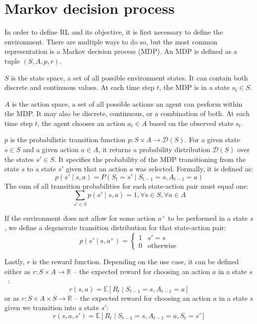 \documentclass[
  digital,     %
  oneside,     %
  nosansbold,  %
  nocolorbold, %
  lof,         %
  lot,         %
]{fithesis4}
\begin{document}
\section{Markov decision process}
In order to define RL and its objective, it is first necessary to define the environment. There are multiple ways to do so, but the most common representation is a Markov decision process (MDP). An MDP is defined as a tuple $(S, A, p, r)$.

$S$ is the state space, a set of all possible environment states. It can contain both discrete and continuous values. At each time step $t$, the MDP is in a state $s_t\in S$.

$A$ is the action space, a set of all possible actions an agent can perform within the MDP. It may also be discrete, continuous, or a combination of both. At each time step $t$, the agent chooses an action $a_t\in A$ based on the observed state $s_t$.

$p$ is the probabilistic transition function $p\colon S \times A \to \mathcal{D}(S)$. For a given state $s\in S$ and a given action $a\in A$, it returns a probability distribution $\mathcal{D}(S)$ over the states $s'\in S$. It specifies the probability of the MDP transitioning from the state $s$ to a state $s'$ given that an action $a$ was selected. Formally, it is defined as:
\begin{equation}
p(s' \mid s,a)=P(S_t=s'\mid S_{t-1}=s,A_{t-1}=a)    
\end{equation}
The sum of all transition probabilities for each state-action pair must equal one:
\begin{equation}
\sum_{s'\in S} p(s'\mid s,a)=1, \forall s \in S, \forall a \in A
\end{equation}

If the environment does not allow for some action $a^{\times}$ to be performed in a state $s$, we define a degenerate transition distribution for that state-action pair:
\begin{equation}
    p(s'\mid s, a^{\times}) =\begin{cases}1 & s' = s\\0 & \text{otherwise} \end{cases} 
\end{equation}

Lastly, $r$ is the reward function. Depending on the use case, it can be defined either as $r\colon S \times A \to \mathbb{R}$ -- the expected reward for choosing an action $a$ in a state $s$~\cite{PA230}:
\begin{equation}
r(s,a)= \mathbb{E} [R_t\mid S_{t-1}=s, A_{t-1}=a]
\end{equation}
or as $r\colon S\times A \times S \to \mathbb{R}$ -- the expected reward for choosing an action $a$ in a state $s$ given we transition into a state $s'$:
\begin{equation}
r(s, a, s')= \mathbb{E} [R_t\mid S_{t-1}=s, A_{t-1}=a, S_t=s']
\end{equation}
\end{document}
